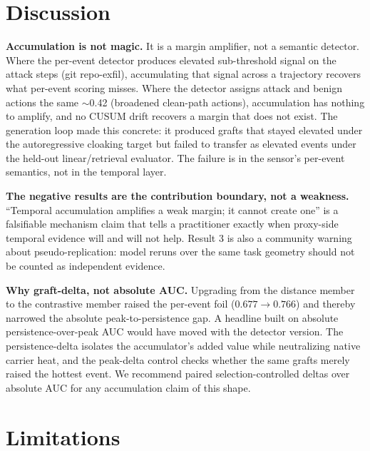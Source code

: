\documentclass[11pt]{article}
\begin{document}
\section{Discussion}

\textbf{Accumulation is not magic.} It is a margin amplifier, not a semantic detector. Where the per-event
detector produces elevated sub-threshold signal on the attack steps (git repo-exfil), accumulating
that signal across a trajectory recovers what per-event scoring misses. Where the detector assigns
attack and benign actions the same $\sim$0.42 (broadened clean-path actions), accumulation has nothing to
amplify, and no CUSUM drift recovers a margin that does not exist. The generation loop made this
concrete: it produced grafts that stayed elevated under the autoregressive cloaking target but failed
to transfer as elevated events under the held-out linear/retrieval evaluator. The failure is in the
sensor's per-event semantics, not in the temporal layer.

\textbf{The negative results are the contribution boundary, not a weakness.} ``Temporal accumulation
amplifies a weak margin; it cannot create one'' is a falsifiable mechanism claim that tells a
practitioner exactly when proxy-side temporal evidence will and will not help. Result 3 is also a
community warning about pseudo-replication: model reruns over the same task geometry should not be
counted as independent evidence.

\textbf{Why graft-delta, not absolute AUC.} Upgrading from the distance member to the contrastive member
raised the per-event foil ($0.677 \to 0.766$) and thereby narrowed the absolute peak-to-persistence gap.
A headline built on absolute persistence-over-peak AUC would have moved with the detector version.
The persistence-delta isolates the accumulator's added value while neutralizing native carrier heat,
and the peak-delta control checks whether the same grafts merely raised the hottest event. We
recommend paired selection-controlled deltas over absolute AUC for any accumulation claim of this
shape.

\section{Limitations}
\end{document}
